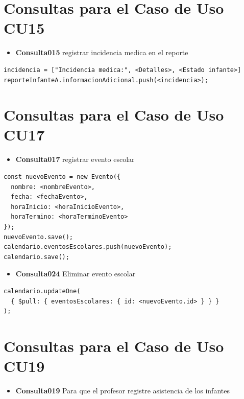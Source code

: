 \section{Consultas para el Caso de Uso CU15}

\begin{itemize}
    \item \textbf{Consulta015} registrar incidencia medica en el reporte
\end{itemize}

\begin{verbatim}
incidencia = ["Incidencia medica:", <Detalles>, <Estado infante>]
reporteInfanteA.informacionAdicional.push(<incidencia>);
\end{verbatim}

\section{Consultas para el Caso de Uso CU17}

\begin{itemize}
    \item \textbf{Consulta017} registrar evento escolar
\end{itemize}

\begin{verbatim}
const nuevoEvento = new Evento({
  nombre: <nombreEvento>,
  fecha: <fechaEvento>,
  horaInicio: <horaInicioEvento>,
  horaTermino: <horaTerminoEvento>
});
nuevoEvento.save();
calendario.eventosEscolares.push(nuevoEvento);
calendario.save();
\end{verbatim}

\begin{itemize}
    \item \textbf{Consulta024} Eliminar evento escolar
\end{itemize}

\begin{verbatim}
calendario.updateOne(
  { $pull: { eventosEscolares: { id: <nuevoEvento.id> } } } 
);
\end{verbatim}


\section{Consultas para el Caso de Uso CU19}

\begin{itemize}
    \item \textbf{Consulta019} Para que el profesor registre asistencia de los infantes
\end{itemize}

